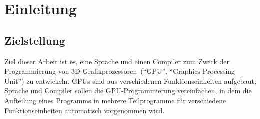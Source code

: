 \documentclass[twoside,a4paper,fleqn,12pt]{book}
\begin{document}
\cleardoublepage
{}
\newcommand\todo[1]{\footnote{\textcolor{red}{TODO: #1}}}
\newcommand\fcite[1]{\footnote{\cite{#1}}}
\newcommand\fciteX[2]{\footnote{\cite{#1}, #2}}

\newcommand\emphalt[1]{\textbf{#1}}

\newcommand\freqPerMesh[1]{\framebox{#1}}
\newcommand\freqPerVert[1]{\colorbox{SpringGreen}{\textcolor{Black}{#1}}}
\newcommand\freqPerFrag[1]{\colorbox{BlueViolet}{\textcolor{White}{#1}}}

\setcounter{secnumdepth}{3}

\chapter{Einleitung}

\section{Zielstellung}

Ziel dieser Arbeit ist es, eine Sprache und einen Compiler zum Zweck der Programmierung von
3D-Grafikprozessoren~(``\gls{GPU}'', ``Graphics Processing Unit'') zu entwickeln.
GPUs sind aus verschiedenen Funktionseinheiten aufgebaut;
Sprache und Compiler sollen die GPU-Programmierung vereinfachen, in dem die Aufteilung eines Programms in mehrere Teilprogramme
für verschiedene Funktionseinheiten automatisch vorgenommen wird.



\end{document}
